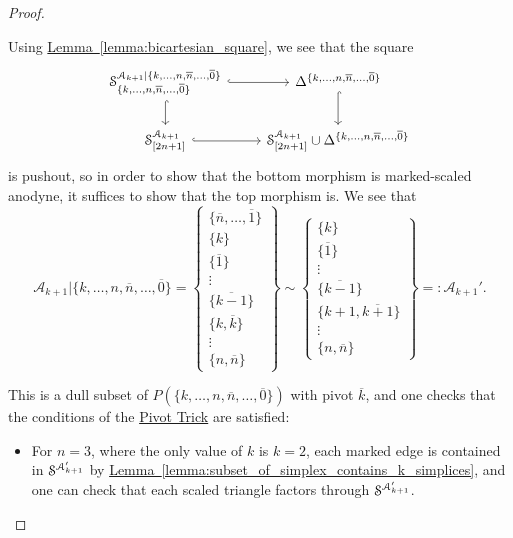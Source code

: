 \documentclass[main.tex]{subfiles}
\begin{document}
\begin{proof}
\begin{enumerate}
\begin{itemize}
          Using \hyperref[lemma:bicartesian_square]{Lemma~\ref*{lemma:bicartesian_square}}, we see that the square
          \begin{equation*}
            \begin{tikzcd}
              \S^{\mathcal{A}_{k+1}|\{k, \ldots, n, \overline{n}, \ldots, \overline{0}\}}_{\{k, \ldots, n, \overline{n}, \ldots, \overline{0}\}}
              \arrow[r, hook]
              \arrow[d, hook]
              & \Delta^{\{k, \ldots, n, \overline{n}, \ldots, \overline{0}\}}
              \arrow[d, hook]
              \\
              \S^{\mathcal{A}_{k+1}}_{[2n+1]}
              \arrow[r, hook]
              & \S^{\mathcal{A}_{k+1}}_{[2n+1]} \cup \Delta^{\{k, \ldots, n, \overline{n}, \ldots, \overline{0}\}}
            \end{tikzcd}
          \end{equation*}
          is pushout, so in order to show that the bottom morphism is marked-scaled anodyne, it suffices to show that the top morphism is. We see that
          \begin{equation*}
            \mathcal{A}_{k+1}|\{k, \ldots, n, \overline{n}, \ldots, \overline{0}\} =
            \left\{ \substack{ \{\overline{n}, \ldots, \overline{1}\} \\ \{k\} \\ \{\overline{1}\} \\ \vdots \\ \{\overline{k-1}\} \\ \{k, \overline{k}\} \\ \vdots \\ \{n, \overline{n}\} } \right\}
            \sim \left\{ \substack{ \{k\} \\ \{\overline{1}\} \\ \vdots \\ \{\overline{k-1}\} \\ \{k+1, \overline{k+1}\} \\ \vdots \\ \{n, \overline{n}\} } \right\} =: \mathcal{A}_{k+1}'.
          \end{equation*}

          This is a dull subset of $P(\{k, \ldots, n, \overline{n}, \ldots, \overline{0}\})$ with pivot $\overline{k}$, and one checks that the conditions of the \hyperref[lemma:pivot_trick]{Pivot Trick} are satisfied: 
          \begin{itemize}
            \item For $n = 3$, where the only value of $k$ is $k = 2$, each marked edge is contained in $\S^{\mathcal{A}_{k+1}'}$ by \hyperref[lemma:subset_of_simplex_contains_k_simplices]{Lemma~\ref*{lemma:subset_of_simplex_contains_k_simplices}}, and one can check that each scaled triangle factors through $\S^{\mathcal{A}_{k+1}'}$.


\end{itemize}
\end{itemize}
\end{enumerate}
\end{proof}
\end{document}
